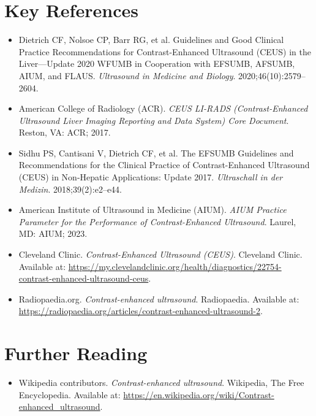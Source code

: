 \section{Key References}

\begin{itemize}
    \item Dietrich CF, Nolsoe CP, Barr RG, et al. Guidelines and Good Clinical Practice Recommendations for Contrast-Enhanced Ultrasound (CEUS) in the Liver---Update 2020 WFUMB in Cooperation with EFSUMB, AFSUMB, AIUM, and FLAUS. \textit{Ultrasound in Medicine and Biology}. 2020;46(10):2579--2604.
    \item American College of Radiology (ACR). \textit{CEUS LI-RADS (Contrast-Enhanced Ultrasound Liver Imaging Reporting and Data System) Core Document}. Reston, VA: ACR; 2017.
    \item Sidhu PS, Cantisani V, Dietrich CF, et al. The EFSUMB Guidelines and Recommendations for the Clinical Practice of Contrast-Enhanced Ultrasound (CEUS) in Non-Hepatic Applications: Update 2017. \textit{Ultraschall in der Medizin}. 2018;39(2):e2--e44.
    \item American Institute of Ultrasound in Medicine (AIUM). \textit{AIUM Practice Parameter for the Performance of Contrast-Enhanced Ultrasound}. Laurel, MD: AIUM; 2023.
    \item Cleveland Clinic. \textit{Contrast-Enhanced Ultrasound (CEUS)}. Cleveland Clinic. Available at: \url{https://my.clevelandclinic.org/health/diagnostics/22754-contrast-enhanced-ultrasound-ceus}.
    \item Radiopaedia.org. \textit{Contrast-enhanced ultrasound}. Radiopaedia. Available at: \url{https://radiopaedia.org/articles/contrast-enhanced-ultrasound-2}.
\end{itemize}

\section{Further Reading}
\begin{itemize}
  \item Wikipedia contributors. \textit{Contrast-enhanced ultrasound}. Wikipedia, The Free Encyclopedia. Available at: \url{https://en.wikipedia.org/wiki/Contrast-enhanced_ultrasound}.
\end{itemize}
